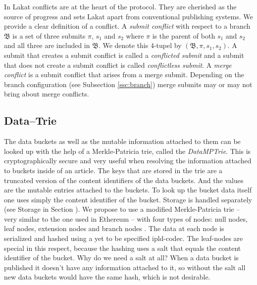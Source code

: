 \documentclass[14pt]{article}
\begin{document}
In Lakat conflicts are at the heart of the protocol. They are cherished as the source of progress and sets Lakat apart from conventional publishing systems. We provide a clear definition of a conflict. A \textit{submit conflict} with respect to a branch $\mathfrak B$ is a set 
of three submits $\pi$, $s_1$ and $s_2$ where $\pi$ is the parent of both $s_1$ and $s_2$ and all three are included in $\mathfrak B$. We denote this 4-tupel by $(\mathfrak B, \pi, s_1, s_2)$.
A submit that creates a submit conflict is called a \textit{conflicted submit} and a submit that does not create a submit conflict is called \textit{conflictless submit}.
A \textit{merge conflict} is a submit conflict that arises from a merge submit. Depending on the branch configuration (see Subsection \ref{ssc:branch}) merge submits may or may not bring about merge conflicts. 


\subsection{Data--Trie}
\label{ssc:datatrie}

The data buckets as well as the mutable information attached to them can be looked up with the help of a Merkle-Patricia trie, called the \textit{DataMPTrie}. This is cryptographically secure and very useful when resolving the information attached to buckets inside of an article. The keys that are stored in the trie are a truncated version of the content identifiers of the data buckets. And the values are the mutable entries attached to the buckets. To look up the bucket data itself one uses simply the content identifier of the bucket. Storage is handled separately (see Storage in Section \label{ssc:storage}).
We propose to use a modified Merkle-Patricia trie -- very similar to the one used in Ethereum -- with four types of nodes: null nodes, leaf nodes, extension nodes and branch nodes \cite{}.
The data at each node is serialized and hashed using a yet to be specified ipld-codec. The leaf-nodes are special in this respect, because the hashing uses a salt that equals the content identifier of the bucket. Why do we need a salt at all? When a data bucket is published it doesn't have any information attached to it, so without the salt all new data buckets would have the same hash, which is not desirable.
\end{document}
